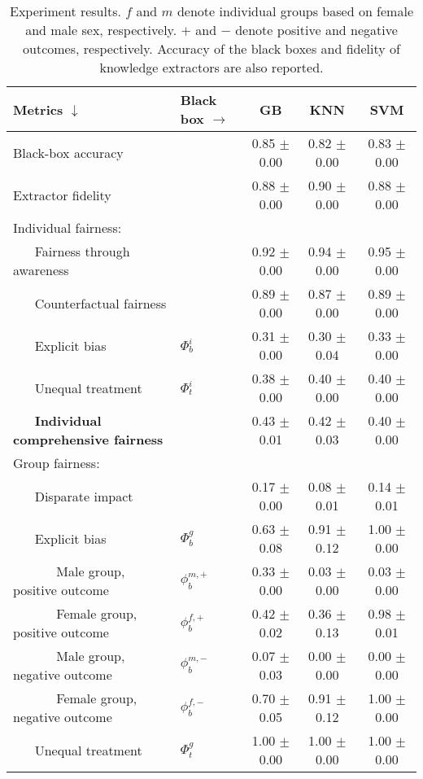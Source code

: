 \documentclass[letterpaper]{article} %
\begin{document}
\begin{table*}[t!]
\small{
	\begin{center}{\caption{Experiment results. $f$ and $m$ denote individual groups based on female and male sex, respectively. $+$ and $-$ denote positive and negative outcomes, respectively. Accuracy of the black boxes and fidelity of knowledge extractors are also reported.}\label{tab:res}}
		\begin{tabular}{ll|c|c|c}
			\toprule
			Metrics $\downarrow$ & Black box $\rightarrow$ & GB & KNN & SVM \\
			\midrule
			Black-box accuracy & & 0.85 $\pm$ 0.00 & 0.82 $\pm$ 0.00 & 0.83 $\pm$ 0.00 \\
			Extractor fidelity & & 0.88 $\pm$ 0.00 & 0.90 $\pm$ 0.00 & 0.88 $\pm$ 0.00 \\
			\midrule
			Individual fairness: & & & & \\
			~ ~ Fairness through awareness & & 0.92 $\pm$ 0.00 & 0.94 $\pm$ 0.00 & 0.95 $\pm$ 0.00 \\
			~ ~ Counterfactual fairness & & 0.89 $\pm$ 0.00 & 0.87 $\pm$ 0.00 & 0.89 $\pm$ 0.00 \\
			~ ~ Explicit bias & $\Phi_b^i$ & 0.31 $\pm$ 0.00 & 0.30 $\pm$ 0.04 & 0.33 $\pm$ 0.00 \\
			~ ~ Unequal treatment & $\Phi_t^i$ & 0.38 $\pm$ 0.00 & 0.40 $\pm$ 0.00 & 0.40 $\pm$ 0.00 \\
			~ ~ \textbf{Individual comprehensive fairness} & & 0.43 $\pm$ 0.01 & 0.42 $\pm$ 0.03 & 0.40 $\pm$ 0.00 \\
			\midrule
			Group fairness: & & & & \\
			~ ~ Disparate impact & & 0.17 $\pm$ 0.00 & 0.08 $\pm$ 0.01 & 0.14 $\pm$ 0.01 \\
			~ ~ Explicit bias & $\Phi_b^g$ & 0.63 $\pm$ 0.08 & 0.91 $\pm$ 0.12 & 1.00 $\pm$ 0.00 \\
			~ ~ ~ ~ Male group, positive outcome & $\phi_b^{m,+}$ & 0.33 $\pm$ 0.00 & 0.03 $\pm$ 0.00 & 0.03 $\pm$ 0.00 \\
			~ ~ ~ ~ Female group, positive outcome & $\phi_b^{f,+}$ & 0.42 $\pm$ 0.02 & 0.36 $\pm$ 0.13 & 0.98 $\pm$ 0.01 \\
			~ ~ ~ ~ Male group, negative outcome & $\phi_b^{m,-}$ & 0.07 $\pm$ 0.03 & 0.00 $\pm$ 0.00 & 0.00 $\pm$ 0.00 \\
			~ ~ ~ ~ Female group, negative outcome & $\phi_b^{f,-}$ & 0.70 $\pm$ 0.05 & 0.91 $\pm$ 0.12 & 1.00 $\pm$ 0.00 \\
			~ ~ Unequal treatment & $\Phi_t^g$ & 1.00 $\pm$ 0.00 & 1.00 $\pm$ 0.00 & 1.00 $\pm$ 0.00 \\

\end{tabular}
\end{center}}
\end{table*}
\end{document}
